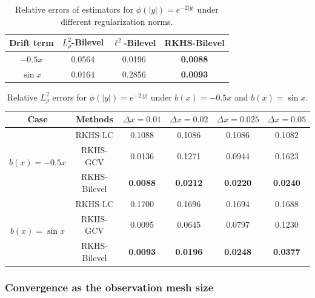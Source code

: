 \documentclass[12pt]{article}
\numberwithin{equation}{section}
\numberwithin{theorem}{section}
\begin{document}
\begin{table}[thb]
    \centering
    \caption{Relative errors of estimators for $\phi(|y|)=e^{-2|y|}$ under different regularization norms.  }
    \begin{tabular}{c|ccc}
        \toprule
         Drift term & $L^2_{\rho}$-Bilevel & $\ell^2$-Bilevel & \textbf{RKHS-Bilevel}\\
        \hline
         $-0.5x$ &0.0564 & 0.0196 &\textbf{0.0088} \\
         
         $\sin x$ & 0.0164 &0.2856 &\textbf{0.0093} \\
        \bottomrule
    \end{tabular}
    \vspace{0cm}
    \label{tab:errorNormE}
\end{table}


\begin{table}[thb]
    \centering
    \caption{Relative $L^2_\rho$ errors for $\phi(|y|)=e^{-2|y|}$ under  $b(x)=-0.5x$ and $b(x)=\sin x$.}
    \begin{tabular}{c c|cccc}
        \toprule
        Case & Methods & $\Delta x = 0.01$ & $\Delta x = 0.02$ & $\Delta x = 0.025$ & $\Delta x = 0.05$ \\
        \midrule
        \multirow{3}{*}{$b(x)=-0.5x$} 
            & RKHS-LC      & 0.1088 & 0.1086 & 0.1086 & 0.1082 \\
            & RKHS-GCV     & 0.0136 & 0.1271 & 0.0944 & 0.1623 \\
            & {RKHS-Bilevel} & \textbf{0.0088} & \textbf{0.0212} & \textbf{0.0220} & \textbf{0.0240} \\
        \midrule
        \multirow{3}{*}{$b(x)=\sin x$} 
            & RKHS-LC      & 0.1700 & 0.1696 & 0.1694 & 0.1688 \\
            & RKHS-GCV     & 0.0095 & 0.0645 & 0.0797 & 0.1230 \\
            & {RKHS-Bilevel} & \textbf{0.0093} & \textbf{0.0196} & \textbf{0.0248} & \textbf{0.0377} \\
        \bottomrule
    \end{tabular}
    \vspace{0cm}
    \label{tab:errorE}
\end{table}





\subsubsection{Convergence as the observation mesh size}
\label{sec:converge}
\end{document}
